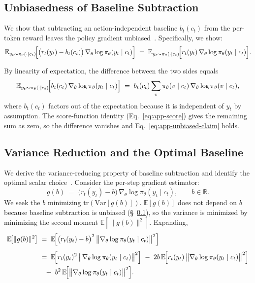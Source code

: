 \documentclass{article}
\begin{document}
\subsection{Unbiasedness of Baseline Subtraction}
\label{app:unbiased}

We show that subtracting an action-independent baseline $b_t(c_t)$ from the per-token reward leaves the policy gradient unbiased~\citep{williams1992simple,sutton1999policygrad}.
Specifically, we show:
\begin{equation}
\label{eq:app-unbiased-claim}
\mathbb{E}_{y_t \sim \pi_\theta(\cdot\mid c_t)}\!\Bigl[
  \bigl(r_t(y_t) - b_t(c_t)\bigr)\,\nabla_\theta\log\pi_\theta(y_t\mid c_t)
\Bigr]
\;=\;
\mathbb{E}_{y_t \sim \pi_\theta(\cdot\mid c_t)}\!\Bigl[
  r_t(y_t)\,\nabla_\theta\log\pi_\theta(y_t\mid c_t)
\Bigr].
\end{equation}

By linearity of expectation, the difference between the two sides equals
\begin{equation}
    \mathbb{E}_{y_t \sim \pi_\theta(\cdot\mid c_t)}\!\Bigl[
  b_t(c_t)\,\nabla_\theta\log\pi_\theta(y_t\mid c_t)
\Bigr]
\;=\;
b_t(c_t)
\sum_{v} \pi_\theta(v\mid c_t)\,\nabla_\theta\log\pi_\theta(v\mid c_t),
\end{equation}
where $b_t(c_t)$ factors out of the expectation because it is independent of $y_t$ by assumption. The score-function identity (Eq.~\eqref{eq:app-score}) gives the remaining sum as zero, so the difference vanishes and Eq.~\eqref{eq:app-unbiased-claim} holds.

\subsection{Variance Reduction and the Optimal Baseline}
\label{app:variance}

We derive the variance-reducing property of baseline subtraction and identify the optimal scalar choice~\citep{greensmith2004variance}. Consider the per-step gradient estimator:
\begin{equation}
    g(b) \;=\; \bigl(r_t(y_t) - b\bigr)\,\nabla_\theta\log\pi_\theta(y_t\mid c_t),
\qquad b \in \mathbb{R}.
\end{equation}
We seek the $b$ minimizing $\mathrm{tr}(\mathrm{Var}[g(b)])$. $\mathbb{E}[g(b)]$ does not depend on $b$ because baseline subtraction is unbiased (\S~\ref{app:unbiased}), so the variance is minimized by minimizing the second moment $\mathbb{E}[\|g(b)\|^2]$. Expanding,
\begin{align}
\mathbb{E}\!\bigl[\|g(b)\|^2\bigr]
&\;=\;
  \mathbb{E}\!\Bigl[
    \bigl(r_t(y_t) - b\bigr)^2\,
    \bigl\|\nabla_\theta\log\pi_\theta(y_t\mid c_t)\bigr\|^2
  \Bigr] \\[4pt]
&\;=\;
  \mathbb{E}\!\Bigl[r_t(y_t)^2\,\bigl\|\nabla_\theta\log\pi_\theta(y_t\mid c_t)\bigr\|^2\Bigr]
  \;-\; 2b\,\mathbb{E}\!\Bigl[r_t(y_t)\,\bigl\|\nabla_\theta\log\pi_\theta(y_t\mid c_t)\bigr\|^2\Bigr] \\
&\quad+\; b^2\,\mathbb{E}\!\Bigl[\bigl\|\nabla_\theta\log\pi_\theta(y_t\mid c_t)\bigr\|^2\Bigr].
\end{align}
\end{document}
